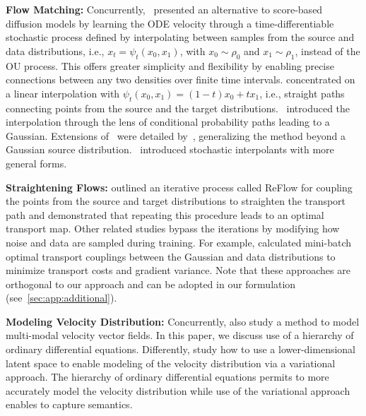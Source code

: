 \textbf{Flow Matching:}
Concurrently,~\citet{liu2023flow,LipmanICLR2023,albergo2023building} presented an alternative to score-based diffusion models by learning the ODE velocity through a time-differentiable stochastic process defined by interpolating between samples from the source and data distributions, i.e., $x_t = \psi_{t} (x_0, x_1)$, 
with $x_0 \sim \rho_0$ and $x_1 \sim \rho_1$, 
instead of the OU process. This offers greater simplicity and flexibility by enabling precise connections between any two densities over finite time intervals. \citet{liu2023flow} concentrated on a linear interpolation with $\psi_{t} (x_0, x_1) = (1-t) x_0 + t x_1$, i.e., straight paths connecting points from the source and the target distributions.~\citet{LipmanICLR2023} introduced the interpolation through the lens of conditional probability paths leading to a Gaussian. Extensions of~\citet{LipmanICLR2023} were detailed by~\citet{tong2023improving}, generalizing the method beyond a Gaussian source distribution.~\citet{albergo2023building,albergo2023stochastic} introduced stochastic interpolants with more general forms. 

\textbf{Straightening Flows:}  
\citet{liu2023flow} outlined an iterative process called ReFlow for coupling the points from the source and target distributions to straighten the transport path and demonstrated that repeating this procedure leads to an optimal transport map. Other related studies bypass the iterations by modifying how noise and data are sampled during training. For example, \citet{pooladian2023multisample,tong2023improving} calculated mini-batch optimal transport couplings between the Gaussian and data distributions to minimize transport costs and gradient variance. %
Note that these approaches are orthogonal to our approach and can be adopted in our formulation (see~\cref{sec:app:additional}). %

\textbf{Modeling Velocity Distribution:} Concurrently, \citet{GuoARXIV2025} also study a method to model multi-modal velocity vector fields. In this paper, we discuss  use of a hierarchy of ordinary differential equations. Differently, \citet{GuoARXIV2025} study how to use a lower-dimensional latent space to enable modeling of the velocity distribution via a variational approach. The hierarchy of ordinary differential equations permits to more accurately model the velocity distribution while use of the variational approach enables to capture semantics.
\vspace{-5pt}